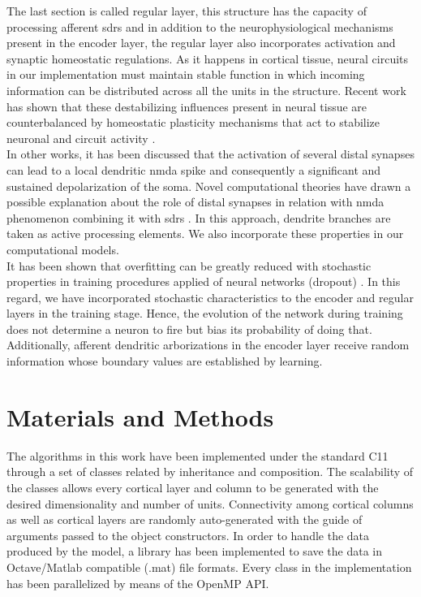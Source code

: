 \documentclass[11pt,a4paper]{article}
\newcommand{\CC}{C\nolinebreak\hspace{-.05em}\raisebox{.4ex}{\tiny\bf +}\nolinebreak\hspace{-.10em}\raisebox{.4ex}{\tiny\bf +}}
\begin{document}
The last section is called regular layer, this structure has the capacity of
processing afferent \glspl{sdr} and in addition to the neurophysiological
mechanisms present in the encoder layer, the regular layer also incorporates
activation and synaptic homeostatic regulations.
As it happens in cortical tissue, neural circuits in our implementation
must maintain stable function in which incoming information can be distributed
across all the units in the structure.
Recent work has shown that these destabilizing influences present in neural tissue
are counterbalanced
by homeostatic plasticity mechanisms that act to stabilize neuronal
and circuit activity \cite{turrigiano_2012}. \\

In other works, it has been discussed 
that the activation of several distal
synapses can lead to a local dendritic \gls{nmda}
spike and consequently a significant
and sustained depolarization of the soma.
Novel computational theories have drawn a possible explanation
about the role of distal synapses in relation with \gls{nmda}
phenomenon \cite{hawkins_2016}
combining it with \glspl{sdr} \cite{ahmad_2016}.
In this approach, dendrite branches are taken as active processing elements.
We also incorporate these properties in our computational models. \\

It has been shown that overfitting can be greatly reduced with
stochastic properties in training procedures
applied of neural networks (dropout) \cite{JMLR:v15:srivastava14a}.
In this regard, we have incorporated stochastic characteristics to
the encoder and regular layers in the training stage.
Hence, the evolution of the network during training does not
determine a neuron to fire but bias its probability
of doing that. Additionally, afferent dendritic arborizations
in the encoder layer receive random information whose
boundary values are established by learning. \\












\section{Materials and Methods}

The algorithms in this work have been implemented under the standard \CC11 through a set of
classes related by inheritance and composition.
The scalability of the classes allows every cortical layer and column to be generated
with the desired dimensionality and number of units. Connectivity among cortical columns as well as
cortical layers are randomly auto-generated with the guide of arguments passed to the
object constructors. In order to handle the data produced by the model,
a library has been implemented to save the data in Octave/Matlab compatible (.mat) file formats.
Every class in the implementation has been parallelized by means of the OpenMP API. \\
\end{document}
